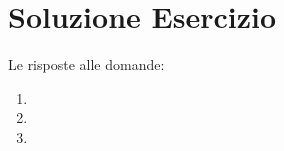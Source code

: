 \documentclass[a4paper]{article}
\begin{document}
	\section{Soluzione Esercizio}
	
	Le risposte alle domande:
	\begin{enumerate}
		\item 
		
		\item 
		
		\item 
	\end{enumerate}
\end{document}

